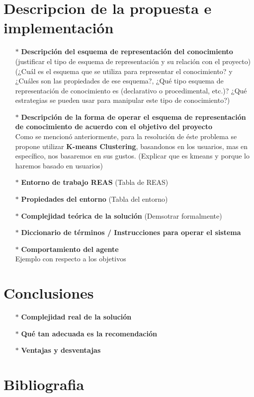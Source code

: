 \documentclass[10pt, a4paper]{article}
\begin{document}
\section{Descripcion de la propuesta e implementaci\'on}
\begin{enumerate}
\item[$\ast$]\textbf{Descripci\'on del esquema de representaci\'on del conocimiento} (justificar el tipo de esquema de representaci\'on y su relaci\'on con el proyecto) (¿Cuál es el esquema que se utiliza para representar el conocimiento? y ¿Cuáles son las propiedades de ese esquema?, ¿Qué tipo esquema de representación de conocimiento es (declarativo o procedimental, etc.)? ¿Qué estrategias se pueden usar para manipular este tipo de conocimiento?)
\item[$\ast$]\textbf{Descripci\'on de la forma de operar el esquema de representaci\'on de conocimiento de acuerdo con el objetivo del proyecto}\\
Como se mencion\'o anteriormente, para la resoluci\'on de \'este problema se propone utilizar \textbf{K-means Clustering}, basandonos en los usuarios, mas en espec\'ifico, nos basaremos en sus gustos. (Explicar que es kmeans y porque lo haremos basado en usuarios)
\item[$\ast$]\textbf{Entorno de trabajo REAS} (Tabla de REAS)
\item[$\ast$]\textbf{Propiedades del entorno} (Tabla del entorno)
\item[$\ast$]\textbf{Complejidad teórica de la solución} (Demsotrar formalmente)
\item[$\ast$]\textbf{Diccionario de t\'erminos / Instrucciones para operar el sistema}
\item[$\ast$]\textbf{Comportamiento del agente} \\
Ejemplo con respecto a los objetivos 
\end{enumerate}
\section{Conclusiones}
\begin{enumerate}
\item[$\ast$]\textbf{Complejidad real de la soluci\'on}
\item[$\ast$]\textbf{Qué tan adecuada es la recomendaci\'on}
\item[$\ast$]\textbf{Ventajas y desventajas}
\end{enumerate}
\section{Bibliografia}
\end{document}
